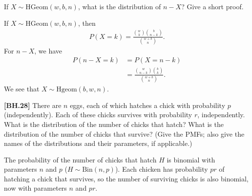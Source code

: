 
\setcounter{theorem}{12}
\begin{exercise}[BH.3.26]
  If $X \sim \text{HGeom}(w, b, n)$, what is the distribution of $n - X$? Give a short proof.
\begin{solution}
	If $X\sim \text{HGeom}(w,b,n)$, then 
    \begin{align*}
    	P(X=k) = \frac{{w \choose k}{b \choose n-k}}{{w+b \choose n}}.
    \end{align*}
    For $n-X$, we have
    \begin{align*}
    	P(n-X=k) & = P(X=n-k)\\
    	& =   \frac{{w \choose n-k}{b \choose k}}{{w+b \choose n}}.
    \end{align*}
    We see that $X\sim\text{Hgeom}(b,w,n)$.
\end{solution}
\end{exercise}

\begin{exercise}
	\textbf{[BH.28]} There are $n$ eggs, each of which hatches a chick with probability $p$ (independently). Each of these chicks survives with probability $r$, independently. What is the distribution of the number of chicks that hatch? What is the distribution of the number of chicks that survive? (Give the PMFs; also give the names of the distributions and their parameters, if applicable.)
\begin{solution}
	The probability of the number of chicks that hatch $H$ is binomial with parameters $n$ and $p$ ($H\sim \text{Bin}(n,p)$). Each chicken has probability $pr$ of hatching a chick that survives, so the number of surviving chicks is also binomial, now with parameters $n$ and $pr$.
\end{solution}
\end{exercise}


